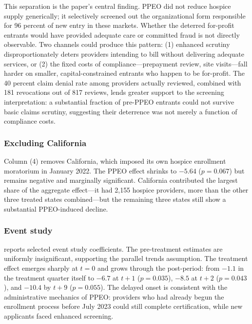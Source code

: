\documentclass[12pt]{article}
\begin{document}
This separation is the paper's central finding. PPEO did not reduce hospice supply generically; it selectively screened out the organizational form responsible for 96 percent of new entry in these markets. Whether the deterred for-profit entrants would have provided adequate care or committed fraud is not directly observable. Two channels could produce this pattern: (1) enhanced scrutiny disproportionately deters providers intending to bill without delivering adequate services, or (2) the fixed costs of compliance---prepayment review, site visits---fall harder on smaller, capital-constrained entrants who happen to be for-profit. The 40 percent claim denial rate among providers actually reviewed, combined with 181 revocations out of 817 reviews, lends greater support to the screening interpretation: a substantial fraction of pre-PPEO entrants could not survive basic claims scrutiny, suggesting their deterrence was not merely a function of compliance costs.

\subsubsection*{Excluding California} Column (4) removes California, which imposed its own hospice enrollment moratorium in January 2022. The PPEO effect shrinks to $-5.64$ ($p = 0.067$) but remains negative and marginally significant. California contributed the largest share of the aggregate effect---it had 2,155 hospice providers, more than the other three treated states combined---but the remaining three states still show a substantial PPEO-induced decline.

\subsubsection*{Event study}  reports selected event study coefficients. The pre-treatment estimates are uniformly insignificant, supporting the parallel trends assumption. The treatment effect emerges sharply at $t = 0$ and grows through the post-period: from $-1.1$ in the treatment quarter itself to $-6.7$ at $t+1$ ($p = 0.035$), $-8.5$ at $t+2$ ($p = 0.043$), and $-10.4$ by $t+9$ ($p = 0.055$). The delayed onset is consistent with the administrative mechanics of PPEO: providers who had already begun the enrollment process before July 2023 could still complete certification, while new applicants faced enhanced screening.



\end{document}
